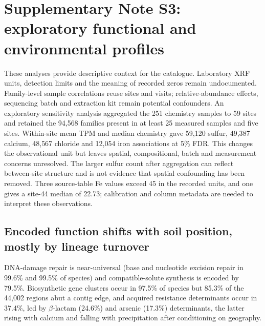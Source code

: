 \documentclass[11pt]{article}
\begin{document}
\section*{Supplementary Note S3: exploratory functional and environmental profiles}
These analyses provide descriptive context for the catalogue. Laboratory XRF units, detection
limits and the meaning of recorded zeros remain undocumented. Family-level sample correlations
reuse sites and visits; relative-abundance effects, sequencing batch and extraction kit remain
potential confounders. An exploratory sensitivity analysis aggregated the 251 chemistry samples to 59 sites and retained the 94{,}568 families present in at least 25 measured samples and five sites. Within-site mean TPM and median chemistry gave 59{,}120 sulfur, 49{,}387 calcium, 48{,}567 chloride and 12{,}054 iron associations at 5\% FDR. This changes the observational unit but leaves spatial, compositional, batch and measurement concerns unresolved. The larger sulfur count after aggregation can reflect between-site structure and is not evidence that spatial confounding has been removed. Three source-table Fe values exceed 45 in the recorded units, and one gives a site-44 median of 22.73; calibration and column metadata are needed to interpret these observations.

\subsection*{Encoded function shifts with soil position, mostly by lineage turnover}

DNA-damage repair
is near-universal (base and nucleotide excision repair in 99.6\% and 99.5\% of species) and
compatible-solute synthesis is encoded by 79.5\%. Biosynthetic gene clusters occur in 97.5\% of
species but 85.3\% of the 44{,}002 regions abut a contig edge, and acquired resistance determinants
occur in 37.4\%, led by $\beta$-lactam (24.6\%) and arsenic (17.3\%) determinants, the latter rising
with calcium and falling with precipitation after conditioning on geography.
\end{document}
